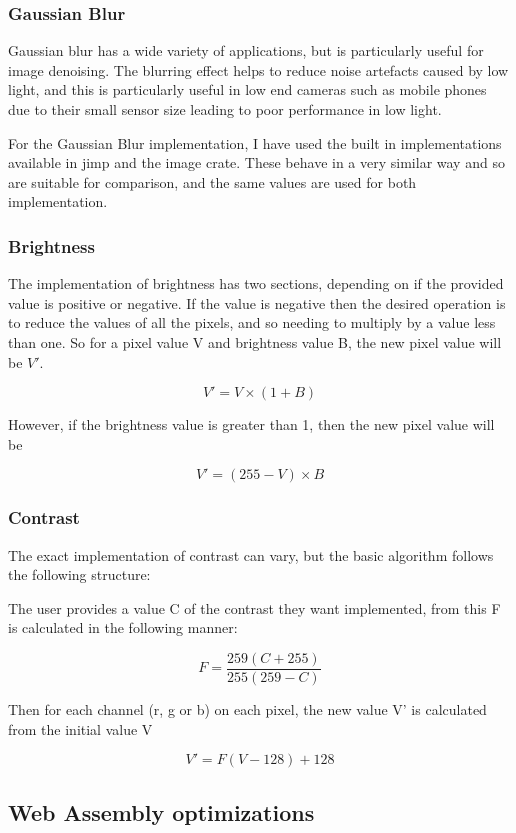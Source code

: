 \documentclass[12pt,a4paper]{article}
\begin{document}
\subsubsection{Gaussian Blur}

Gaussian blur has a wide variety of applications, but is particularly useful for image denoising. The blurring effect helps to reduce noise artefacts caused by low light, and this is particularly useful in low end cameras such as mobile phones due to their small sensor size leading to poor performance in low light.


For the Gaussian Blur implementation, I have used the built in implementations available in jimp and the image crate. These behave in a very similar way and so are suitable for comparison, and the same values are used for both implementation.

\subsubsection{Brightness}

The implementation of brightness has two sections, depending on if the provided value is positive or negative. If the value is negative then the desired operation is to reduce the values of all the pixels, and so needing to multiply by a value less than one. So for a pixel value V and brightness value B, the new pixel value will be $V'$.

$$
    V'=V\times(1+B)
$$

However, if the brightness value is greater than 1, then the new pixel value will be

$$
    V'=(255-V)\times B
$$


\subsubsection{Contrast}

The exact implementation of contrast can vary, but the basic algorithm follows the following structure:

The user provides a value C of the contrast they want implemented, from this F is calculated in the following manner:

$$
    F=\frac{259(C+255)}{255(259-C)}
$$

Then for each channel (r, g or b) on each pixel, the new value V' is calculated from the initial value V

$$
    V'=F(V-128)+128
$$

\subsection{Web Assembly optimizations}
\end{document}
